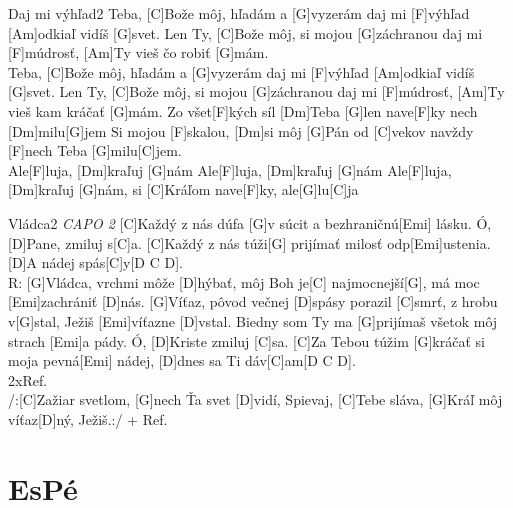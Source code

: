 \documentclass[12pt]{article}
\begin{document}
\begin{song}{Daj mi výhľad}{2}
	Teba, [C]Bože môj, hľadám a [G]vyzerám
	daj mi [F]výhľad [Am]odkiaľ vidíš [G]svet.
	Len Ty, [C]Bože môj, si mojou [G]záchranou
	daj mi [F]múdrosť, [Am]Ty vieš čo robiť [G]mám.
	\\
	Teba, [C]Bože môj, hľadám a [G]vyzerám
	daj mi [F]výhľad [Am]odkiaľ vidíš [G]svet.
	Len Ty, [C]Bože môj, si mojou [G]záchranou
	daj mi [F]múdrosť, [Am]Ty vieš kam kráčať [G]mám.
	\columnbreak
	Zo všet[F]kých síl [Dm]Teba [G]len
	nave[F]ky nech [Dm]milu[G]jem
	Si mojou [F]skalou, [Dm]si môj [G]Pán
	od [C]vekov navždy [F]nech Teba [G]milu[C]jem.
	\\
	Ale[F]luja, [Dm]kraľuj [G]nám
	Ale[F]luja, [Dm]kraľuj [G]nám
	Ale[F]luja, [Dm]kraľuj [G]nám,
	si [C]Kráľom nave[F]ky, ale[G]lu[C]ja
\end{song}

\begin{song}{Vládca}{2}
	\textit{CAPO 2}
	[C]Každý z nás dúfa [G]v súcit 
	a bezhraničnú[Emi] lásku.
	Ó, [D]Pane, zmiluj s[C]a.
	[C]Každý z nás túži[G] prijímať 
	milosť odp[Emi]ustenia.
	[D]A nádej spás[C]y[D C D].
	\\
	R: [G]Vládca, vrchmi môže [D]hýbať,
	môj Boh je[C] najmocnejší[G], 
	má moc [Emi]zachrániť [D]nás.
	[G]Víťaz, pôvod večnej [D]spásy
	porazil [C]smrť, z hrobu v[G]stal,
	Ježiš [Emi]víťazne [D]vstal.
	\columnbreak
	[C]Biedny som Ty ma [G]prijímaš 
	všetok môj strach [Emi]a pády.
	Ó, [D]Kriste zmiluj [C]sa.
	[C]Za Tebou túžim [G]kráčať 
	si moja pevná[Emi] nádej,
	[D]dnes sa Ti dáv[C]am[D C D].
	\\
	2xRef.
	\\
	/:[C]Zažiar svetlom, 
	[G]nech Ťa svet [D]vidí, Spievaj, 
	[C]Tebe sláva, 
	[G]Kráľ môj víťaz[D]ný, Ježiš.:/ + Ref.
\end{song}

\newpage
\section{EsPé}
\end{document}
